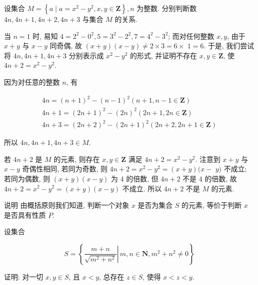 \begin{example}
	设集合 $M=\left\{a \mid a=x^{2}-y^{2}, x, y \in \mathbf{Z}\right\}, n$ 为整数. 分别判断数 $4 n ,  4 n+1 ,  4 n+2 ,  4 n+3$ 与集合 $M$ 的关系.
\end{example}

\begin{analysis}
	当 $n=1$ 时, 易知 $4=2^{2}-0^{2}, 5=3^{2}-2^{2}, 7=4^{2}-3^{2}$; 而对任何整数 $x ,  y$, 由于 $x+y$ 与 $x-y$ 同奇偶, 故 $(x+y)(x-y) \neq 2 \times 3=6 \times$ $1=6$. 于是, 我们尝试将 $4 n ,  4 n+1 ,  4 n+3$ 分别表示成 $x^{2}-y^{2}$ 的形式, 并证明不存在 $x, y \in \mathbf{Z}$, 使 $4 n+2=x^{2}-y^{2}$.
\end{analysis}

\begin{solution}
	因为对任意的整数 $n$, 有

	\begin{gather*}
		4 n=(n+1)^{2}-(n-1)^{2}(n+1, n-1 \in \mathbf{Z}) \\
		4 n+1=(2 n+1)^{2}-(2 n)^{2}(2 n+1,2 n \in \mathbf{Z}) \\
		4 n+3=(2 n+2)^{2}-(2 n+1)^{2}(2 n+2,2 n+1 \in \mathbf{Z})
	\end{gather*}

	所以 $4 n, 4 n+1,4 n+3 \in M$.

	若 $4 n+2$ 是 $M$ 的元素, 则存在 $x, y \in \mathbf{Z}$ 满足 $4 n+2=x^{2}-y^{2}$. 注意到 $x+y$ 与 $x-y$ 奇偶性相同, 若同为奇数, 则 $4 n+2=x^{2}-y^{2}=(x+y)(x-$ $y)$ 不成立; 若同为偶数, 则 $(x+y)(x-y)$ 为 4 的倍数, 但 $4 n+2$ 不是 4 的倍数, 故 $4 n+2=x^{2}-y^{2}=(x+y)(x-y)$ 不成立. 所以 $4 n+2$ 不是 $M$ 的元素.

	说明 由概括原则我们知道, 判断一个对象 $x$ 是否为集合 $S$ 的元素, 等价于判断 $x$ 是否具有性质 $P$.
\end{solution}

\begin{example}
	设集合

	$$
		S=\left\{\left.\frac{m+n}{\sqrt{m^{2}+n^{2}}} \right\rvert\, m, n \in \mathbf{N}, m^{2}+n^{2} \neq 0\right\}
	$$

	证明: 对一切 $x, y \in S$, 且 $x<y$, 总存在 $z \in S$, 使得 $x<z<y$.
\end{example}

